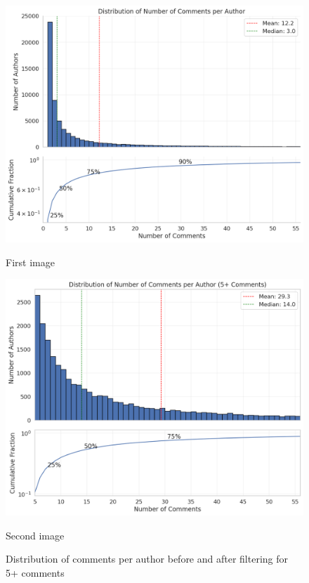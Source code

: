 \documentclass[twoside]{ctuthesis}
\theoremstyle{plain}
\theoremstyle{definition}
\theoremstyle{note}
\begin{document}
\begin{figure}[htbp]
  \centering
  
  \begin{minipage}[b]{0.6\linewidth}
    \centering
    \includegraphics[width=\linewidth]{figures/comments_per_author.png}
    \caption{First image}
    \label{fig:first}
  \end{minipage}
  
  \vspace{1em} %
  
  \begin{minipage}[b]{0.6\linewidth}
    \centering
    \includegraphics[width=\linewidth]{figures/comments_5_plus.png}
    \caption{Second image}
    \label{fig:second}
  \end{minipage}
  
  \caption{Distribution of comments per author before and after filtering for 5+ comments}
  \label{fig:pair}
\end{figure}
\end{document}
